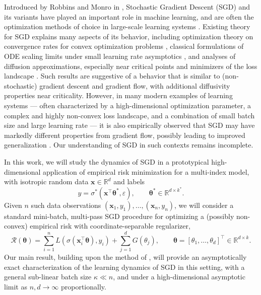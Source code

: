 \documentclass[11pt,letterpaper,reqno]{amsart}
\theoremstyle{definition}
\def\eps{\varepsilon}
\def\R{\mathbb{R}}
\def\cR{\mathcal{R}}
\def\x{\mathbf{x}}
\def\btheta{\boldsymbol{\theta}}
\begin{document}
Introduced by Robbins and Monro in \cite{robbins1951stochastic}, Stochastic Gradient
Descent (SGD) and its variants have played an important role in machine
learning, and are often the optimization methods of choice in large-scale
learning systems \cite{bottou2010large,bottou2018optimization}. Existing theory for SGD explains many aspects
of its behavior, including optimization theory on convergence rates for
convex optimization problems \cite{nemirovski2009robust,moulines2011non,rakhlin2012making,bach2013non}, classical formulations of
ODE scaling limits under small learning rate asymptotics
\cite{ljung1992stochastic,kushner2003stochastic}, and
analyses of diffusion approximations, especially near critical points and
minimizers of the loss landscape
\cite{mandt2017stochastic,li2017stochastic,feng2018semigroups,hu2019diffusion,blanc2020implicit,li2022happens}.
Such results are suggestive of a behavior that is similar to (non-stochastic)
gradient descent and gradient flow,
with additional diffusivity properties near criticality.
However, in many modern examples of learning systems --- often
characterized by a high-dimensional optimization parameter, a complex and
highly non-convex loss landscape, and a combination of small batch size and
large learning rate --- it is also empirically observed that SGD may have
markedly different properties from gradient flow, possibly leading to improved
generalization \cite{keskar2017large,jastrzkebski2017three}. Our understanding
of SGD in such contexts remains incomplete.

In this work, we will study the dynamics of SGD in a prototypical
high-dimensional application of empirical risk minimization for a multi-index
model, with isotropic random data $\x \in \R^d$ and labels
\[y=\sigma^*(\x^\top \btheta^*,\eps), \qquad \btheta^* \in \R^{d \times k^*}.\]
Given $n$ such data observations $(\x_1,y_1),\ldots,(\x_n,y_n)$, we will
consider a standard mini-batch, multi-pass SGD procedure for optimizing a
(possibly non-convex) empirical risk with coordinate-separable regularizer,
\begin{equation}\label{eq:ERMintro}
\cR(\btheta)=\sum_{i=1}^n L(\sigma(\x_i^\top \btheta),y_i)+\sum_{j=1}^d
G(\theta_j), \qquad \btheta=[\theta_1,\ldots,\theta_d]^\top \in \R^{d \times
k}.
\end{equation}
Our main result, building upon the method of \cite{celentano2021high}, will
provide an asymptotically exact characterization of the
learning dynamics of SGD in this setting, with a general sub-linear batch
size $\kappa \ll n$, and under a high-dimensional asymptotic limit
as $n,d \to \infty$ proportionally.
\end{document}
